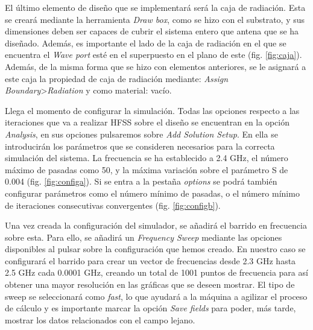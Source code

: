 \par El último elemento de diseño que se implementará será la caja de radiación. Esta se creará mediante la herramienta \textit{Draw box}, como se hizo con el substrato, y sus dimensiones deben ser capaces de cubrir el sistema entero que antena que se ha diseñado. Además, es importante el lado de la caja de radiación en el que se encuentra el \textit{Wave port} esté en el superpuesto en el plano de este (fig. \ref{fig:caja}). Además, de la misma forma que se hizo con elementos anteriores, se le asignará a este caja la propiedad de caja de radiación mediante: \textit{Assign Boundary}>\textit{Radiation} y como material: vacío.
\\
\par Llega el momento de configurar la simulación. Todas las opciones respecto a las iteraciones que va a realizar HFSS sobre el diseño se encuentran en la opción \textit{Analysis}, en sus opciones pulsaremos sobre \textit{Add Solution Setup}. En ella se introducirán los parámetros que se consideren necesarios para la correcta simulación del sistema. La frecuencia se ha establecido a 2.4 GHz, el número máximo de pasadas como 50, y la máxima variación sobre el parámetro S de 0.004 (fig. \ref{fig:configa}). Si se entra a la pestaña \textit{options} se podrá también configurar parámetros como el número mínimo de pasadas, o el número mínimo de iteraciones consecutivas convergentes (fig. \ref{fig:configb}).
\\
\par Una vez creada la configuración del simulador, se añadirá el barrido en frecuencia sobre esta. Para ello, se añadirá un \textit{Frequency Sweep} mediante las opciones disponibles al pulsar sobre la configuración que hemos creado. En nuestro caso se configurará el barrido para crear un vector de frecuencias desde 2.3 GHz hasta 2.5 GHz cada 0.0001 GHz, creando un total de 1001 puntos de frecuencia para así obtener una mayor resolución en las gráficas que se deseen mostrar. El tipo de sweep se seleccionará como \textit{fast}, lo que ayudará a la máquina a agilizar el proceso de cálculo y es importante marcar la opción \textit{Save fields} para poder, más tarde, mostrar los datos relacionados con el campo lejano.
\\
